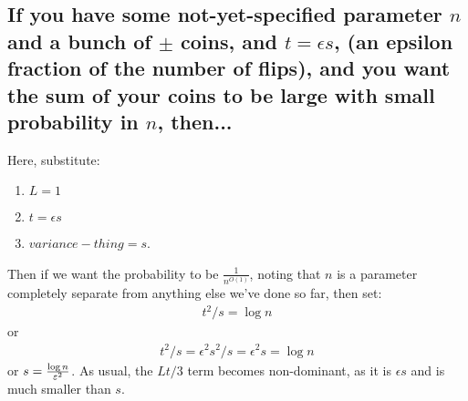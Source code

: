 \documentclass[12pt]{article}
\begin{document}
  \subsection{If you have some not-yet-specified parameter $n$ and a bunch of $\pm$ coins, and $t = \epsilon s$, (an epsilon fraction of the number of flips), and you want the sum of your coins to be large with small probability in $n$, then...}
  Here, substitute:
  \begin{enumerate}
    \item $L=1$
    \item $t = \epsilon s$
    \item $variance-thing = s$.
  \end{enumerate}
  Then if we want the probability to be $\frac{1}{n^{O(1)}}$, noting that $n$ is a parameter completely separate from anything else we've done so far, then set:
  \begin{align}
    t^2/s = \log n
  \end{align}
  or
  \begin{align}
    t^2/s = \epsilon^2 s^2 / s = \epsilon^2 s = \log n
  \end{align}
  or $s = \frac{\log n}{\varepsilon^2}$. As usual, the $Lt/3$ term becomes non-dominant, as it is $\epsilon s$ and is much smaller than $s$.
\end{document}

